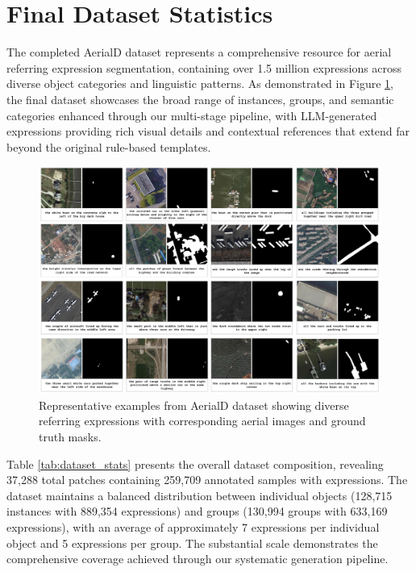 \section{Final Dataset Statistics}

The completed AerialD dataset represents a comprehensive resource for aerial referring expression segmentation, containing over 1.5 million expressions across diverse object categories and linguistic patterns. As demonstrated in Figure \ref{fig:dataset_examples}, the final dataset showcases the broad range of instances, groups, and semantic categories enhanced through our multi-stage pipeline, with LLM-generated expressions providing rich visual details and contextual references that extend far beyond the original rule-based templates.

\begin{figure}[H]
\centering
\includegraphics[width=\textwidth]{Images/dataset.png}
\caption{Representative examples from AerialD dataset showing diverse referring expressions with corresponding aerial images and ground truth masks.}
\label{fig:dataset_examples}
\end{figure}

Table \ref{tab:dataset_stats} presents the overall dataset composition, revealing 37,288 total patches containing 259,709 annotated samples with expressions. The dataset maintains a balanced distribution between individual objects (128,715 instances with 889,354 expressions) and groups (130,994 groups with 633,169 expressions), with an average of approximately 7 expressions per individual object and 5 expressions per group. The substantial scale demonstrates the comprehensive coverage achieved through our systematic generation pipeline.

